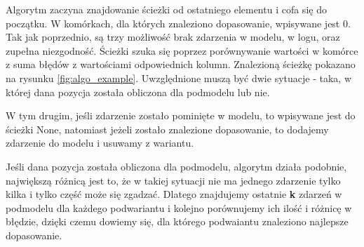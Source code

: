 Algorytm zaczyna znajdowanie ścieżki od ostatniego elementu i cofa się do początku. W komórkach, dla których znaleziono dopasowanie, wpisywane jest 0. Tak jak poprzednio, są trzy możliwość brak zdarzenia w modelu, w logu, oraz zupełna niezgodność. Ścieżki szuka się poprzez porównywanie wartości w komórce z suma błędów z wartościami odpowiednich kolumn. Znalezioną ścieżkę pokazano na rysunku \ref{fig:algo_example}. Uwzględnione muszą być dwie sytuacje - taka, w której dana pozycja została obliczona dla podmodelu lub nie.

W tym drugim, jeśli zdarzenie zostało pominięte w modelu, to wpisywane jest do ścieżki None, natomiast jeżeli zostało znalezione dopasowanie, to dodajemy zdarzenie do modelu i usuwamy z wariantu.

Jeśli dana pozycja została obliczona dla podmodelu, algorytm działa podobnie, największą różnicą jest to, że w takiej sytuacji nie ma jednego zdarzenie tylko kilka i tylko część może się zgadzać. Dlatego znajdujemy ostatnie \textbf{k} zdarzeń w podmodelu dla każdego podwariantu i kolejno porównujemy ich ilość i różnicę w błędzie, dzięki czemu dowiemy się, dla którego podwaiantu znaleziono najlepsze dopasowanie. 

